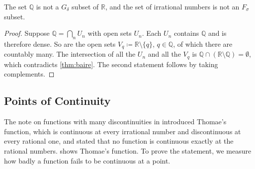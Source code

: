 \begin{proposition}
\label{prop:q-not-gdelta}
The set $\mathbb Q$ is not a $G_\delta$ subset of $\mathbb R$, and the set of irrational numbers is not an $F_\sigma$ subset.
\end{proposition}

\begin{proof}
Suppose $\mathbb Q=\bigcap_nU_n$ with open sets $U_n$. Each $U_n$ contains $\mathbb Q$ and is therefore dense. So are the open sets $V_q\coloneqq\mathbb R\setminus\{q\}$, $q\in\mathbb Q$, of which there are countably many. The intersection of all the $U_n$ and all the $V_q$ is $\mathbb Q\cap(\mathbb R\setminus\mathbb Q)=\emptyset$, which contradicts \cref{thm:baire}. The second statement follows by taking complements.
\end{proof}

\subsection{Points of Continuity}

The note on functions with many discontinuities in  introduced Thomae's function, which is continuous at every irrational number and discontinuous at every rational one, and stated that no function is continuous exactly at the rational numbers.  shows Thomae's function. To prove the statement, we measure how badly a function fails to be continuous at a point.


